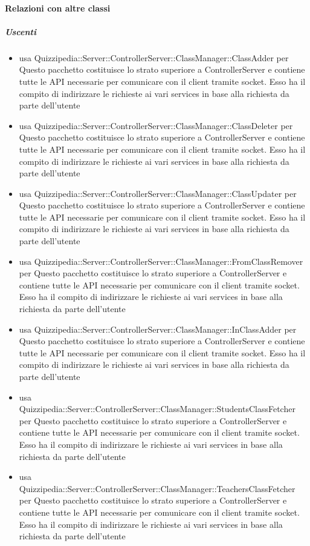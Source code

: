 \paragraph{Relazioni con altre classi}
\subparagraph{Uscenti}
\begin{itemize}
\item usa Quizzipedia::Server::ControllerServer::ClassManager::ClassAdder per Questo pacchetto costituisce lo strato superiore a ControllerServer e contiene tutte le API necessarie per comunicare con il client tramite socket. Esso ha il compito di indirizzare le richieste ai vari services in base alla richiesta da parte dell'utente
\item usa Quizzipedia::Server::ControllerServer::ClassManager::ClassDeleter per Questo pacchetto costituisce lo strato superiore a ControllerServer e contiene tutte le API necessarie per comunicare con il client tramite socket. Esso ha il compito di indirizzare le richieste ai vari services in base alla richiesta da parte dell'utente
\item usa Quizzipedia::Server::ControllerServer::ClassManager::ClassUpdater per Questo pacchetto costituisce lo strato superiore a ControllerServer e contiene tutte le API necessarie per comunicare con il client tramite socket. Esso ha il compito di indirizzare le richieste ai vari services in base alla richiesta da parte dell'utente
\item usa Quizzipedia::Server::ControllerServer::ClassManager::FromClassRemover per Questo pacchetto costituisce lo strato superiore a ControllerServer e contiene tutte le API necessarie per comunicare con il client tramite socket. Esso ha il compito di indirizzare le richieste ai vari services in base alla richiesta da parte dell'utente
\item usa Quizzipedia::Server::ControllerServer::ClassManager::InClassAdder per Questo pacchetto costituisce lo strato superiore a ControllerServer e contiene tutte le API necessarie per comunicare con il client tramite socket. Esso ha il compito di indirizzare le richieste ai vari services in base alla richiesta da parte dell'utente
\item usa Quizzipedia::Server::ControllerServer::ClassManager::StudentsClassFetcher per Questo pacchetto costituisce lo strato superiore a ControllerServer e contiene tutte le API necessarie per comunicare con il client tramite socket. Esso ha il compito di indirizzare le richieste ai vari services in base alla richiesta da parte dell'utente
\item usa Quizzipedia::Server::ControllerServer::ClassManager::TeachersClassFetcher per Questo pacchetto costituisce lo strato superiore a ControllerServer e contiene tutte le API necessarie per comunicare con il client tramite socket. Esso ha il compito di indirizzare le richieste ai vari services in base alla richiesta da parte dell'utente
\end{itemize}
